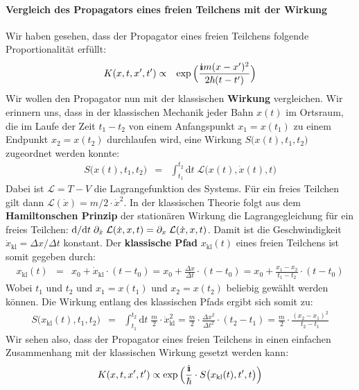 \paragraph{Vergleich des Propagators eines freien Teilchens mit der Wirkung}

Wir haben gesehen, dass der Propagator eines freien Teilchens folgende Proportionalität erfüllt: 
\begin{eqnarray*} 
	K(x,t,x',t') &\propto& \exp\Big(\frac{\I m(x-x')^2}{2\hbar (t-t')}\Big)
\end{eqnarray*} 
Wir wollen den Propagator nun mit der klassischen {\bf Wirkung} vergleichen. Wir erinnern uns, dass in der klassischen Mechanik jeder Bahn $x(t)$ im Ortsraum, die im Laufe der Zeit $t_1-t_2$ von einem Anfangspunkt $x_1=x(t_1)$ zu einem Endpunkt $x_2=x(t_2)$ durchlaufen wird, eine Wirkung $S\big(x(t),t_1,t_2\big)$ zugeordnet werden konnte:
\begin{eqnarray*}
	S\big(x(t),t_1,t_2\big) &=& \int_{t_1}^{t_2}\mathrm{d}t\; \mathcal{L}\big(x(t),\dot{x}(t),t\big)
\end{eqnarray*}
Dabei ist $\mathcal{L}=T-V$ die Lagrangefunktion des Systems. Für ein freies Teilchen gilt dann $\mathcal{L}(\dot{x})=m/2\cdot\dot{x}^2$. In der klassischen Theorie folgt aus dem {\bf Hamiltonschen Prinzip} der stationären Wirkung die Lagrangegleichung für ein freies Teilchen: $\mathrm{d}/\mathrm{d}t\;\partial_{\dot{x}}\;\mathcal{L}(\dot{x},x,t)=\partial_x\;\mathcal{L}(\dot{x},x,t)$. Damit ist die Geschwindigkeit $\dot{x}_{\text{kl}}=\Delta x/\Delta t$ konstant. Der {\bf klassische Pfad} $x_{\text{kl}}(t)$ eines freien Teilchens ist somit gegeben durch: 
\begin{eqnarray*}
	x_{\text{kl}}(t) &=& x_0 + \dot{x}_{\text{kl}}\cdot(t-t_0) = x_0 + \frac{\Delta x}{\Delta t}\cdot(t-t_0) = x_0 + \frac{x_1-x_2}{t_1-t_2}\cdot(t-t_0) 
\end{eqnarray*}
Wobei $t_1$ und $t_2$ und $x_1=x(t_1)$ und $x_2=x(t_2)$ beliebig gewählt werden können. Die Wirkung entlang des klassischen Pfads ergibt sich somit zu: 
\begin{eqnarray*}
	S\big(x_{\text{kl}}(t),t_1,t_2\big) &=& \int_{t_1}^{t_2}\mathrm{d}t\; \frac{m}{2} \cdot\dot{x}_{\text{kl}}^2 = \frac{m}{2}\cdot \frac{\Delta x^2}{\Delta t^2}\cdot (t_2-t_1) = \frac{m}{2}\cdot \frac{(x_2-x_1)^2}{t_2-t_1}
\end{eqnarray*}
Wir sehen also, dass der Propagator eines freien Teilchens in einen einfachen Zusammenhang mit der klassischen Wirkung gesetzt werden kann: 
\begin{eqnarray*}
	K(x,t,x',t')\propto \exp\Big(\frac{\I}{\hbar}\cdot S\big(x_{\text{kl}}(t),t',t\big)\Big)
\end{eqnarray*}


